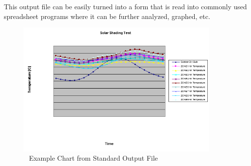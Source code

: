 This output file can be easily turned into a form that is read into commonly used spreadsheet programs where it can be further analyzed, graphed, etc.

\begin{figure}[hbtp] %
\centering
\includegraphics[width=0.9\textwidth, height=0.9\textheight, keepaspectratio=true]{media/image003.png}
\caption{  Example Chart from Standard Output File \protect \label{fig:example-chart-from-standard-output-file}}
\end{figure}
